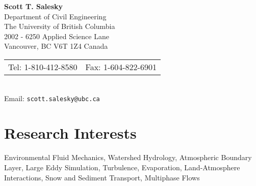 \documentclass[11pt,letterpaper]{article}
\begin{document}

\pagestyle{empty}           %

\ifdefined{}
    \pagestyle{fancy}
    \fancyfoot{}                        %
    \fancyhead{}                        %
    \setcounter{page}{2}
    \renewcommand{\headrulewidth}{0pt}
\fi


\begin{center}
    \textbf{\Large Scott T. Salesky} \\
    Department of Civil Engineering \\
    The University of British Columbia \\
    2002 - 6250 Applied Science Lane \\
    Vancouver, BC V6T 1Z4 Canada \\
    \begin{tabular}{c c}
        Tel: 1-810-412-8580 & Fax: 1-604-822-6901
    \end{tabular} \\
    Email: \texttt{scott.salesky@ubc.ca}
\end{center}

\section*{Research Interests} 

Environmental Fluid Mechanics, Watershed Hydrology, Atmospheric Boundary Layer,
Large Eddy Simulation, Turbulence, Evaporation, Land-Atmosphere Interactions,
Snow and Sediment Transport, Multiphase Flows

\end{document}
